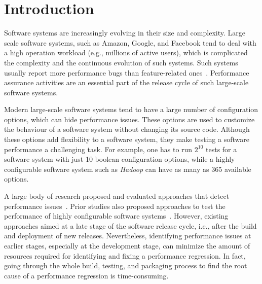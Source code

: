 
\section{Introduction}
\label{sec:intro}
Software systems are increasingly evolving in their size and complexity.
Large scale software systems, such as Amazon, Google, and Facebook tend to deal with a high operation workload (e.g., millions of active users), which is complicated the complexity and the continuous evolution of such systems. Such systems usually report more performance bugs than feature-related ones~\cite{weyuker2000experience}.
Performance assurance activities are an essential part of the release cycle of such large-scale software systems.

Modern large-scale software systems tend to have a large number of configuration options, which can hide performance issues. %
These options are used to customize the behaviour of a software system without changing its source code. Although these options add flexibility to a software system, they make testing a software performance a challenging task. For example, one has to run $2^
{10}$ tests for a software system with just 10 boolean configuration options, while a highly configurable software system such as \emph{Hadoop} can have as many as 365 %
available options. 
 
A large body of research proposed and evaluated approaches that detect performance issues~\cite{Nguyen:2012:ADP,nguyen2011automated,Nguyen:2014:ICS,foo2010mining,DBLP:conf/icse/FooJAHZF15}. Prior studies also proposed approaches to test the performance of highly configurable software systems~\cite{DBLP:journals/dt/SaxenaFHMYM00,wu2010performance,DBLP:journals/ese/HalinNADPB19}. However, existing approaches aimed at a late stage of the software release cycle, i.e., after the build and deployment of new releases. Nevertheless, identifying performance issues at earlier stages, especially at the development stage, can minimize the amount of resources required for identifying and fixing a performance regression. In fact, going through the whole build, testing, and packaging process to find the root cause of a performance regression is time-consuming. 



